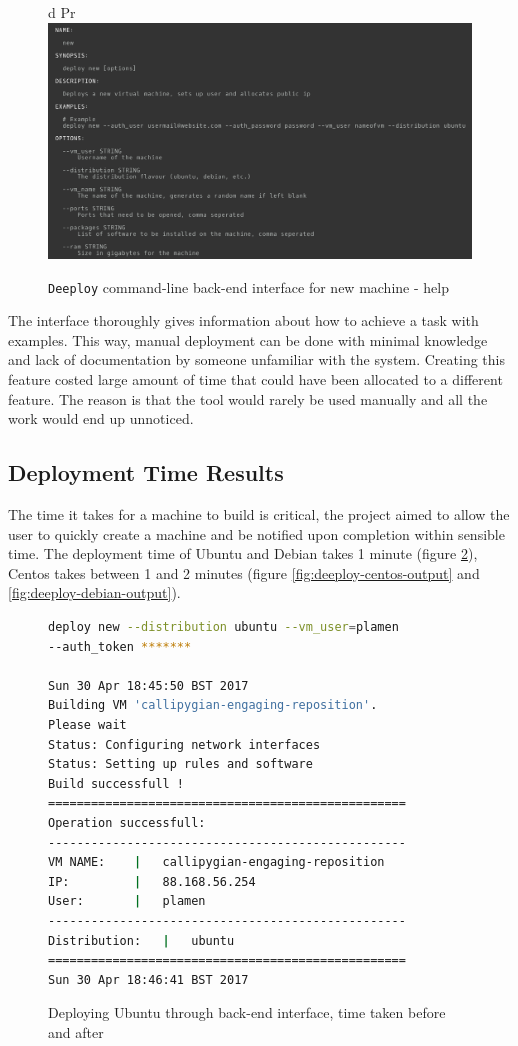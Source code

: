 \documentclass{article}
\begin{document}
\begin{figure}[h!]
d Pr\vspace{0.5cm}
\includegraphics[width=12cm]{deeploy_new_help_cli}
\vspace{0.5cm}
\caption{\texttt{Deeploy} command-line back-end interface for new machine - help}
\label{fig:deeploy-new-help}
\end{figure}

The interface thoroughly gives information about how to achieve a task with examples. This way, manual deployment can be done with minimal knowledge and lack of documentation by someone unfamiliar with the system. Creating this feature costed large amount of time that could have been allocated to a different feature. The reason is that the tool would rarely be used manually and all the work would end up unnoticed.

\subsection{Deployment Time Results}
The time it takes for a machine to build is critical, the project aimed to allow the user to quickly create a machine and be notified upon completion within sensible time. The deployment time of Ubuntu and Debian takes 1 minute (figure \ref{fig:deeploy-ubuntu-output}), Centos takes between 1 and 2 minutes (figure \ref{fig:deeploy-centos-output} and  \ref{fig:deeploy-debian-output}). 

\begin{figure}[H]
\begin{lstlisting}[frame=single, language=Bash]
deploy new --distribution ubuntu --vm_user=plamen 
--auth_token *******

Sun 30 Apr 18:45:50 BST 2017
Building VM 'callipygian-engaging-reposition'.
Please wait 
Status: Configuring network interfaces
Status: Setting up rules and software
Build successfull !
==================================================
Operation successfull:
--------------------------------------------------
VM NAME:	|	callipygian-engaging-reposition
IP:			|	88.168.56.254
User:		|	plamen
--------------------------------------------------
Distribution:	|	ubuntu
==================================================
Sun 30 Apr 18:46:41 BST 2017
\end{lstlisting}
\caption{Deploying Ubuntu through back-end interface, time taken before and after}
\label{fig:deeploy-ubuntu-output}
\end{figure}
\end{document}
